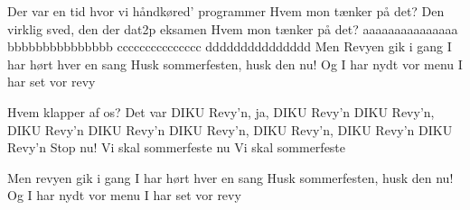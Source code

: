 \documentclass[danish]{article}
\begin{document}
\begin{song}
         Der var en tid hvor vi håndkøred' programmer    
                        Hvem mon tænker på det?                         
                        Den virklig sved, den der dat2p eksamen         
                        Hvem mon tænker på det?                         
                        aaaaaaaaaaaaaaa                                 
                        bbbbbbbbbbbbbbb                                 
                        ccccccccccccccc                                 
                        ddddddddddddddd                                 
                        Men
             Revyen gik i gang                               
                        I har hørt hver en sang                         
         Husk sommerfesten, husk den nu!                 
             Og I har nydt vor menu                          
                        I har set vor revy                              

         Hvem klapper af os?                             
                        Det var DIKU Revy'n, ja,
                        DIKU Revy'n
             DIKU Revy'n, DIKU Revy'n
         DIKU Revy'n
             DIKU Revy'n, DIKU Revy'n, DIKU Revy'n
         DIKU Revy'n
                        Stop nu!
                        Vi skal sommerfeste nu                          
             Vi skal sommerfeste                             


             Men revyen gik i gang                           
                        I har hørt hver en sang                         
         Husk sommerfesten, husk den nu!                 
             Og I har nydt vor menu                          
                        I har set vor revy                              


\end{song}
\end{document}
